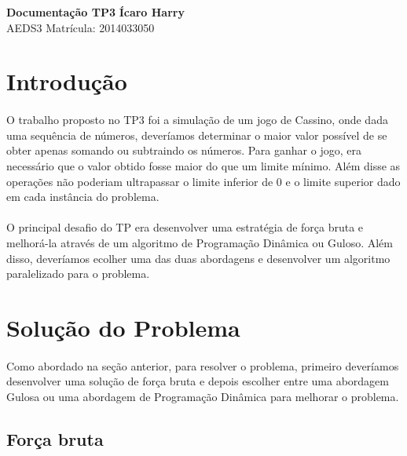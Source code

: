 \documentclass[a4paper, 12pt]{article}
\begin{document}
\noindent
\large\textbf{Documentação TP3} \hfill \textbf{Ícaro Harry} \\
\normalsize AEDS3 \hfill  Matrícula: 2014033050\\


\section{Introdução}
\paragraph{}
O trabalho proposto no TP3 foi a simulação de um jogo de Cassino, onde dada uma sequência de números, deveríamos determinar o maior valor possível de se obter apenas somando ou subtraindo os números. Para ganhar o jogo, era necessário que o valor obtido fosse maior do que um limite mínimo. Além disse as operações não poderiam ultrapassar o limite inferior de 0 e o limite superior dado em cada instância do problema.
\paragraph{}
O principal desafio do TP era desenvolver uma estratégia de força bruta e melhorá-la através de um algoritmo de Programação Dinâmica ou Guloso. Além disso, deveríamos ecolher uma das duas abordagens e desenvolver um algoritmo paralelizado para o problema.

\section{Solução do Problema}
\paragraph{}
Como abordado na seção anterior, para resolver o problema, primeiro deveríamos desenvolver uma solução de força bruta e depois escolher entre uma abordagem Gulosa ou uma abordagem de Programação Dinâmica para melhorar o problema.

\subsection{Força bruta}
\end{document}
